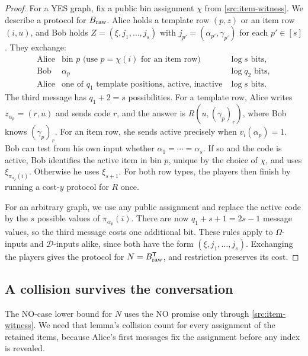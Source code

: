 \documentclass[11pt,letterpaper]{article} \usepackage[utf8]{inputenc}
\theoremstyle{plain} \newtheorem{theorem}{Theorem}[section]
\theoremstyle{definition} \newaliascnt{definition}{theorem}
\begin{document}
\begin{proof}
For a YES graph, fix a public bin assignment $\chi$ from
\cref{src:item-witness}. We describe a protocol for $B_{\rm raw}$.
Alice holds a template row $(p,z)$ or an
item row $(i,u)$, and Bob holds $Z=(\xi,j_1,\ldots,j_s)$ with
$j_{p'}=(\alpha_{p'},\gamma_{p'})$ for each $p'\in[s]$. They exchange:
\[
\begin{array}{lll}
\text{Alice} & \text{bin }p\text{ (use }p=\chi(i)\text{ for an item row)}
  & \log s\text{ bits},\\
\text{Bob} & \alpha_p & \log q_2\text{ bits},\\
\text{Alice} & \text{one of }q_1\text{ template positions, active, inactive}
  & \log s\text{ bits}.
\end{array}
\]
The third message has $q_1+2=s$ possibilities. For a template row, Alice
writes $z_{\alpha_p}=(r,u)$ and sends code $r$, and the answer is
$R(u,(\gamma_p)_r)$, where Bob knows $(\gamma_p)_r$. For an item row, she sends
active precisely when $v_i(\alpha_p)=1$. Bob can test from his own input
whether $\alpha_1=\cdots=\alpha_s$. If so and the code is active, Bob
identifies the active item in bin $p$, unique by the choice of $\chi$, and uses $\xi_{\pi_{\alpha_p}(i)}$. Otherwise he
uses $\xi_{s+1}$. For both row types, the players
then finish by running a cost-$y$ protocol for $R$ once.

For an arbitrary graph, we use any public assignment and replace the active
code by the $s$ possible values of $\pi_{\alpha_p}(i)$. There are now
$q_1+s+1=2s-1$ message values, so the third message costs one additional bit.
These rules apply to $\Omega$-inputs and $\mathcal D$-inputs alike, since
both have the form $(\xi,j_1,\ldots,j_s)$. Exchanging the players gives the
protocol for $N=B_{\rm raw}^{\mathsf T}$, and restriction preserves its cost.
\end{proof}

\subsection{A collision survives the conversation}
\label{sec:collision-conversation}

The NO-case lower bound for $N$ uses the NO promise only
through \cref{src:item-witness}. We need that lemma's collision count for every assignment of the retained items, because Alice's
first messages fix the assignment before any index is revealed.
\end{document}
